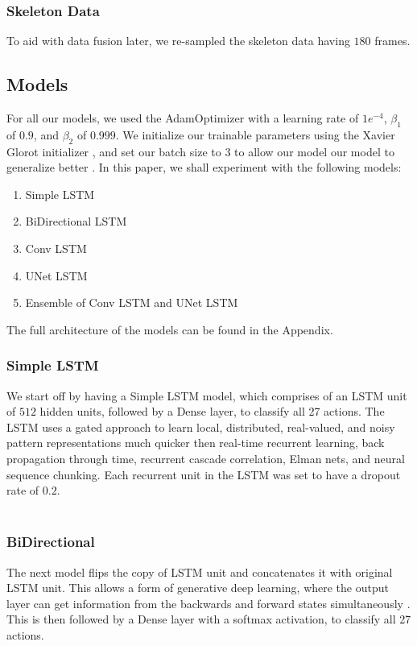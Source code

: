 \documentclass[conference]{IEEEtran}
\begin{document}
\subsubsection{Skeleton Data}
To aid with data fusion later, we re-sampled the skeleton data having $180$ frames. 
\subsection{Models}
For all our models, we used the AdamOptimizer \cite{Adam} with a learning rate of $1e^{-4}$, $\beta_1$ of $0.9$, and $\beta_2$ of $0.999$. We initialize our trainable parameters using the Xavier Glorot initializer \cite{GlorotB10}, and set our batch size to $3$ to allow our model our model to generalize better \cite{HofferHS17}. In this paper, we shall experiment with the following models: 
\begin{enumerate}
\item Simple LSTM
\item BiDirectional LSTM
\item Conv LSTM
\item UNet LSTM
\item Ensemble of Conv LSTM and UNet LSTM
\end{enumerate}
\vspace{0.5cm}
The full architecture of the models can be found in the Appendix.
\subsubsection{Simple LSTM}
We start off by having a Simple LSTM model, which comprises of an LSTM unit of $512$ hidden units, followed by a Dense layer, to classify all 27 actions. The LSTM \cite{LSTM} uses a gated approach to learn local, distributed, real-valued, and noisy pattern representations much quicker then real-time recurrent learning, back propagation through time, recurrent cascade correlation, Elman nets, and neural sequence chunking. Each recurrent unit in the LSTM was set to have a dropout rate of $0.2$.\\ \\
\subsubsection{BiDirectional}
The next model flips the copy of LSTM unit and concatenates it with original LSTM unit. This allows a form of generative deep learning, where the output layer can get information from the backwards and forward states simultaneously \cite{bidirectionalrecurrent}. This is then followed by a Dense layer with a softmax activation, to classify all 27 actions.\\ \\
\end{document}
